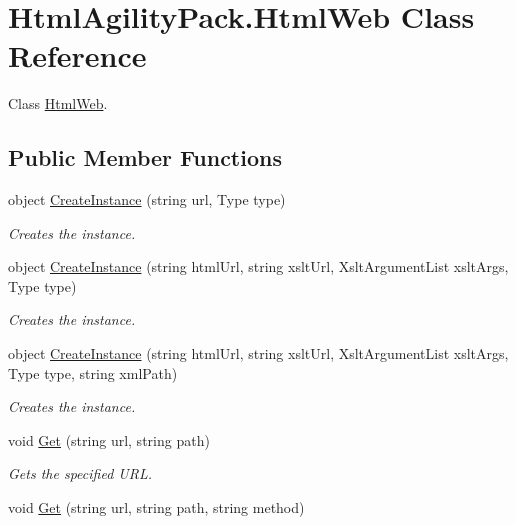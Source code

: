 \hypertarget{class_html_agility_pack_1_1_html_web}{}\section{Html\+Agility\+Pack.\+Html\+Web Class Reference}
\label{class_html_agility_pack_1_1_html_web}


Class \hyperlink{class_html_agility_pack_1_1_html_web}{Html\+Web}.  


\subsection*{Public Member Functions}
\begin{DoxyCompactItemize}
\item 
object \hyperlink{class_html_agility_pack_1_1_html_web_ad7c151beda99cb79cd7c2e11b0fa0584}{Create\+Instance} (string url, Type type)
\begin{DoxyCompactList}\small\item\em Creates the instance. \end{DoxyCompactList}\item 
object \hyperlink{class_html_agility_pack_1_1_html_web_ad30fe64e9ea8206065f8cc3c1f3af966}{Create\+Instance} (string html\+Url, string xslt\+Url, Xslt\+Argument\+List xslt\+Args, Type type)
\begin{DoxyCompactList}\small\item\em Creates the instance. \end{DoxyCompactList}\item 
object \hyperlink{class_html_agility_pack_1_1_html_web_a2ba5b7bceba646788b9e57b102cd63b4}{Create\+Instance} (string html\+Url, string xslt\+Url, Xslt\+Argument\+List xslt\+Args, Type type, string xml\+Path)
\begin{DoxyCompactList}\small\item\em Creates the instance. \end{DoxyCompactList}\item 
void \hyperlink{class_html_agility_pack_1_1_html_web_a358f22d674ef5560cde6df0b03ec9cf8}{Get} (string url, string path)
\begin{DoxyCompactList}\small\item\em Gets the specified U\+RL. \end{DoxyCompactList}\item 
void \hyperlink{class_html_agility_pack_1_1_html_web_a93c860c18604bdb0cec2d8274d6e772b}{Get} (string url, string path, string method)

\end{DoxyCompactItemize}
